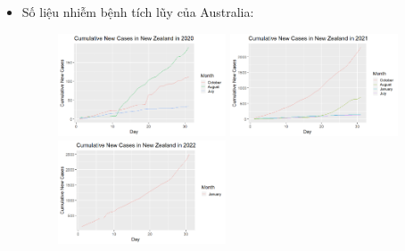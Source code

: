 \documentclass[a4paper]{article}
\theoremstyle{definition}
\begin{document}
\begin{enumerate}[i)]
\begin{enumerate}[1]
    \begin{itemize}
    \item{Số liệu nhiễm bệnh tích lũy của Australia:}\\ 
     \begin{figure}[htp!]
    \includegraphics[width=0.47\textwidth]{Images/7.7v.png}
    \includegraphics[width=0.47\textwidth]{Images/7.8v.png}
    \includegraphics[width=0.47\textwidth]{Images/7.9v.png}
  \end{figure}
    \end{itemize}
    

\end{enumerate}
\end{enumerate}
\end{document}

